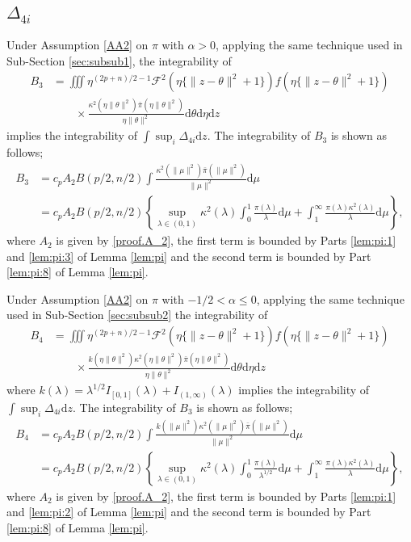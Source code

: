 \documentclass[preprint,11pt]{imsart}
\numberwithin{equation}{section}
\theoremstyle{plain}
\theoremstyle{definition}
\theoremstyle{remark}
\newcommand{\rd}{\mathrm{d}}
\begin{document}
  \subsection{$\Delta_{4i}$}
\label{sec:delta67}
Under Assumption \ref{AA2} on $\pi$ with $\alpha>0$,
applying the same technique used in Sub-Section \ref{sec:subsub1},
the integrability of
\begin{align*}
B_3 & =\iiint \eta^{(2p+n)/2-1}  \mathcal{F}^2(\eta\{\|z-\theta\|^2+1\})
 f(\eta\{\|z-\theta\|^2+1\}) \\
&\qquad \times \frac{\kappa^2(\eta\|\theta\|^2)\bar{\pi}(\eta\|\theta\|^2)}{\eta\|\theta\|^2}
 \rd \theta   \rd \eta  \rd z 
\end{align*}
implies the integrability of $ \int  \sup_i\Delta_{4i}\rd z$. 
The integrability of $B_3$ is shown as follows;
\begin{align*}
B_3 & =c_pA_2B(p/2,n/2)\int 
\frac{\kappa^2(\|\mu\|^2)\bar{\pi}(\|\mu\|^2)}{\|\mu\|^2}
 \rd \mu \\
 &=c_pA_2B(p/2,n/2)\left\{
\sup_{\lambda\in(0,1)}\kappa^2(\lambda)\int_0^1 \frac{\pi(\lambda)}{\lambda} \rd \mu 
 +\int_1^\infty \frac{\pi(\lambda)\kappa^2(\lambda)}{\lambda} \rd \mu
 \right\},
\end{align*}
where $A_2$ is given by \eqref{proof.A_2},
the first term is bounded by Parts \ref{lem:pi:1} and \ref{lem:pi:3} of Lemma \ref{lem:pi}
and the second term is bounded by Part \ref{lem:pi:8} of Lemma \ref{lem:pi}.

Under Assumption \ref{AA2} on $\pi$ with $-1/2<\alpha\leq 0$,
applying the same technique used in Sub-Section \ref{sec:subsub2}
the integrability of
\begin{align*}
B_4 & =\iiint \eta^{(2p+n)/2-1}  \mathcal{F}^2(\eta\{\|z-\theta\|^2+1\})
 f(\eta\{\|z-\theta\|^2+1\}) \\
 &\qquad \times
 \frac{k(\eta\|\theta\|^2)\kappa^2(\eta\|\theta\|^2)\bar{\pi}(\eta\|\theta\|^2)}{\eta\|\theta\|^2}
 \rd \theta   \rd \eta  \rd z 
\end{align*}
where $k(\lambda)=\lambda^{1/2}I_{[0,1]}(\lambda) + I_{(1,\infty)}(\lambda)$
implies the integrability of $\int  \sup_i\Delta_{4i}\rd z$.
The integrability of $B_3$ is shown as follows;
\begin{align*}
B_4 & =c_pA_2B(p/2,n/2)\int 
\frac{k(\|\mu\|^2)\kappa^2(\|\mu\|^2)\bar{\pi}(\|\mu\|^2)}{\|\mu\|^2}
 \rd \mu \\
 &=c_pA_2B(p/2,n/2)\left\{
\sup_{\lambda\in(0,1)}\kappa^2(\lambda)\int_0^1 \frac{\pi(\lambda)}{\lambda^{1/2}} \rd \mu 
 +\int_1^\infty \frac{\pi(\lambda)\kappa^2(\lambda)}{\lambda} \rd \mu \right\},
\end{align*}
where $A_2$ is given by \eqref{proof.A_2},
the first term is bounded by Parts \ref{lem:pi:1} and \ref{lem:pi:2} of Lemma \ref{lem:pi}
and the second term is bounded by Part \ref{lem:pi:8} of Lemma \ref{lem:pi}.
\end{document}
